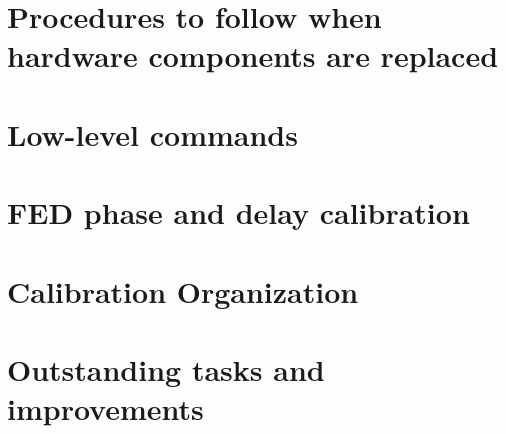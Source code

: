 \documentclass[12pt]{article}
\begin{document}
\section{Procedures to follow when hardware components are replaced}
\label{sec:hardware}


\section{Low-level commands}
\label{sec:lowlevel}


\clearpage

\appendix
\section{FED phase and delay calibration}
\label{App:phaseanddelay}



\section{Calibration Organization}
\label{App:caliborganize}


\section{Outstanding tasks and improvements}
\label{App:outstanding}


\clearpage



\end{document}
